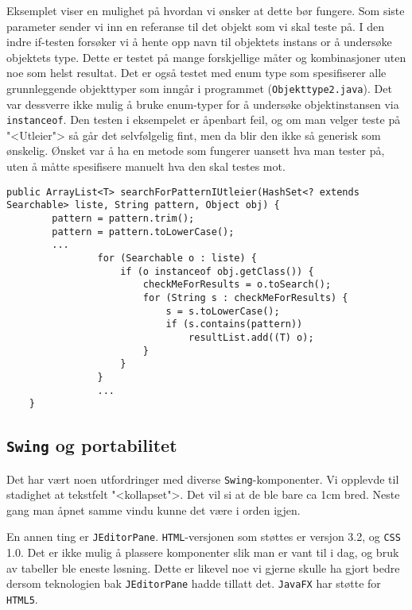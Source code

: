 Eksemplet viser en mulighet på hvordan vi ønsker at dette bør fungere. Som siste parameter sender vi inn en referanse til det objekt som vi skal teste på. I den indre if-testen forsøker vi å hente opp navn til objektets instans or å undersøke objektets type. Dette er testet på mange forskjellige måter og kombinasjoner uten noe som helst resultat. 
Det er også testet med enum type som spesifiserer alle grunnleggende objekttyper som inngår i programmet (\texttt{Objekttype2.java}). 
Det var dessverre ikke mulig å bruke enum-typer for å undersøke objektinstansen via \texttt{instanceof}. Den testen i eksempelet er åpenbart feil, og om man velger teste på "<Utleier"> så går det selvfølgelig fint, men da blir den ikke så generisk som ønskelig. Ønsket var å ha en metode som fungerer uansett hva man tester på, uten å måtte spesifisere manuelt hva den skal testes mot.


\begin{lstlisting}[caption=Problem med å teste for objekttype (rad 6)., label=kode:objekttype]
    public ArrayList<T> searchForPatternIUtleier(HashSet<? extends Searchable> liste, String pattern, Object obj) {
        pattern = pattern.trim();
        pattern = pattern.toLowerCase();
        ...
                for (Searchable o : liste) {
                    if (o instanceof obj.getClass()) {
                        checkMeForResults = o.toSearch();
                        for (String s : checkMeForResults) {
                            s = s.toLowerCase();
                            if (s.contains(pattern))
                                resultList.add((T) o);
                        }
                    }
                }     
                ...
    }
\end{lstlisting}




\subsection{\texttt{Swing} og portabilitet} \label{subsec:portabilitet}
Det har vært noen utfordringer med diverse \texttt{Swing}-komponenter. Vi opplevde til stadighet at tekstfelt "<kollapset">. Det vil si at de ble bare ca 1cm bred. Neste gang man åpnet samme vindu kunne det være i orden igjen. 

En annen ting er \texttt{JEditorPane}. \texttt{HTML}-versjonen som støttes er versjon 3.2, og \texttt{CSS} 1.0. 
Det er ikke mulig å plassere komponenter slik man er vant til i dag, og bruk av tabeller ble eneste løsning. Dette er likevel noe vi gjerne skulle ha gjort bedre dersom teknologien bak \texttt{JEditorPane} hadde tillatt det. \texttt{JavaFX} har støtte for \texttt{HTML5}.


